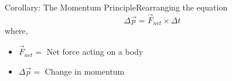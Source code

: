\begin{frame}{Corollary: The Momentum Principle}{Rearranging the equation}
	\begin{equation}
	\Delta \vec{p} = \vec{F}_{net} \times {\Delta t}
	\end{equation}
	where,
	\begin{itemize}
	\item \(\vec{F}_{net} = \) Net force acting on a body	
	\item \(\Delta\vec{p} = \)
		Change in momentum
	\end{itemize}
\end{frame}